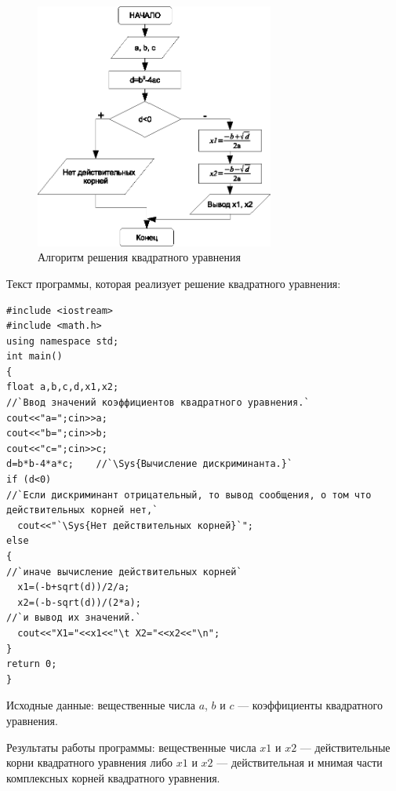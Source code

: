 \begin{figure}[htb]
\begin{center}
\includegraphics[width=0.7\textwidth]{img/ris_3_15}
\caption{Алгоритм решения квадратного уравнения}
\label{ch03:refDrawing14}
\end{center}
\end{figure}

Текст программы, которая реализует решение квадратного уравнения: 
\begin{lstlisting}
#include <iostream>
#include <math.h>
using namespace std;
int main()
{
float a,b,c,d,x1,x2;
//`Ввод значений коэффициентов квадратного уравнения.`
cout<<"a=";cin>>a;
cout<<"b=";cin>>b;
cout<<"c=";cin>>c;
d=b*b-4*a*c;	//`\Sys{Вычисление дискриминанта.}`
if (d<0)        
//`Если дискриминант отрицательный, то вывод сообщения, о том что действительных корней нет,`
  cout<<"`\Sys{Нет действительных корней}`";
else
{
//`иначе вычисление действительных корней`
  x1=(-b+sqrt(d))/2/a;
  x2=(-b-sqrt(d))/(2*a);
//`и вывод их значений.`
  cout<<"X1="<<x1<<"\t X2="<<x2<<"\n";
}
return 0;
}
\end{lstlisting}


Исходные данные: вещественные числа $a$, $b$ и $c$ --- коэффициенты
квадратного уравнения.

Результаты работы программы: вещественные числа $x1$ и $x2$ --- действительные корни
квадратного уравнения либо $x1$ и $x2$ --- действительная и мнимая части комплексных
корней квадратного уравнения.

